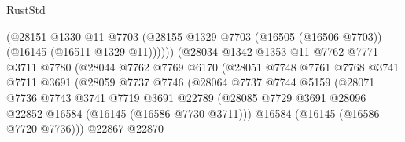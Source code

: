 \begin{lexlean}{RustStd}
\begin{coremodule}
                                      (@28151
                                        @1330
                                        @11
                                        @7703
                                        (@28155
                                          @1329
                                          @7703
                                          (@16505 (@16506 @7703))
                                          (@16145 (@16511 @1329 @11))))))
                                  (@28034
                                    @1342
                                    @1353
                                    @11
                                    @7762
                                    @7771
                                    @3711
                                    @7780
                                    (@28044
                                      @7762
                                      @7769
                                      @6170
                                      (@28051
                                        @7748
                                        @7761
                                        @7768
                                        @3741
                                        @7711
                                        @3691
                                        (@28059
                                          @7737
                                          @7746
                                          (@28064
                                            @7737
                                            @7744
                                            @5159
                                            (@28071
                                              @7736
                                              @7743
                                              @3741
                                              @7719
                                              @3691
                                              @22789
                                              (@28085
                                                @7729
                                                @3691
                                                @28096
                                                @22852
                                                @16584
                                                (@16145 (@16586 @7730 @3711)))
                                              @16584
                                              (@16145 (@16586 @7720 @7736)))
                                            @22867
                                            @22870

\end{coremodule}
\end{lexlean}
